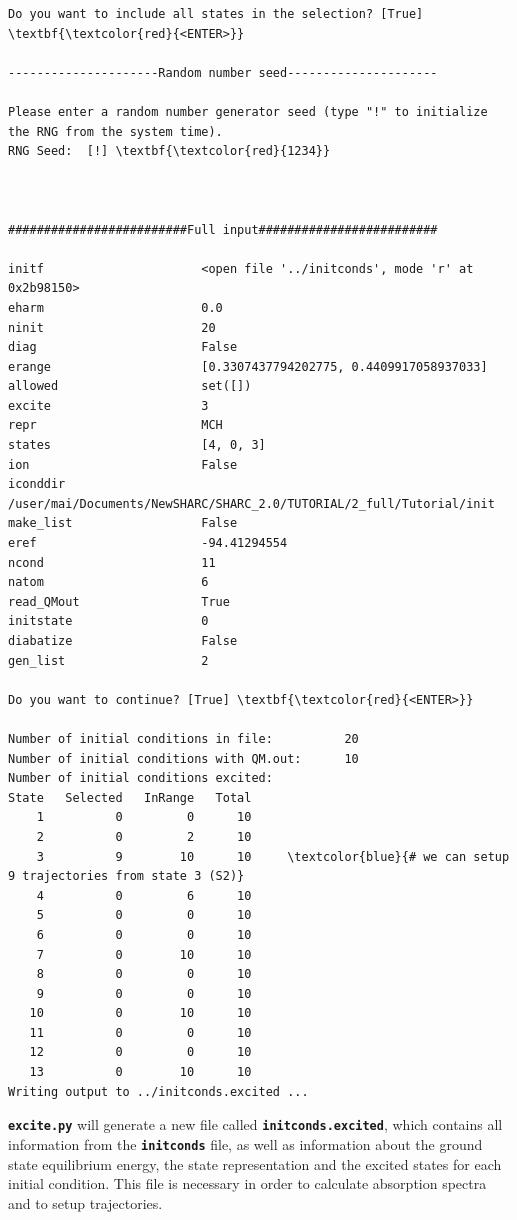 \documentclass[a4paper,11pt,DIV=15,openany]{scrbook}
\newcommand{\ttt}[1]{\textbf{\texttt{#1}}}
\begin{document}
\begin{oframed}
\begin{Verbatim}[commandchars=\\\{\}]
Do you want to include all states in the selection? [True] \textbf{\textcolor{red}{<ENTER>}}

---------------------Random number seed---------------------

Please enter a random number generator seed (type "!" to initialize the RNG from the system time).
RNG Seed:  [!] \textbf{\textcolor{red}{1234}}



#########################Full input#########################

initf                      <open file '../initconds', mode 'r' at 0x2b98150>
eharm                      0.0
ninit                      20
diag                       False
erange                     [0.3307437794202775, 0.4409917058937033]
allowed                    set([])
excite                     3
repr                       MCH
states                     [4, 0, 3]
ion                        False
iconddir                   /user/mai/Documents/NewSHARC/SHARC_2.0/TUTORIAL/2_full/Tutorial/init
make_list                  False
eref                       -94.41294554
ncond                      11
natom                      6
read_QMout                 True
initstate                  0
diabatize                  False
gen_list                   2

Do you want to continue? [True] \textbf{\textcolor{red}{<ENTER>}}

Number of initial conditions in file:          20
Number of initial conditions with QM.out:      10
Number of initial conditions excited:
State   Selected   InRange   Total
    1          0         0      10
    2          0         2      10
    3          9        10      10     \textcolor{blue}{# we can setup 9 trajectories from state 3 (S2)}
    4          0         6      10
    5          0         0      10
    6          0         0      10
    7          0        10      10
    8          0         0      10
    9          0         0      10
   10          0        10      10
   11          0         0      10
   12          0         0      10
   13          0        10      10
Writing output to ../initconds.excited ...
\end{Verbatim}
\end{oframed}

\normalsize

\ttt{excite.py} will generate a new file called \ttt{initconds.excited}, which contains all information from the \ttt{initconds} file, as well as information about the ground state equilibrium energy, the state representation and the excited states for each initial condition. 
This file is necessary in order to calculate absorption spectra and to setup trajectories.
\end{document}
